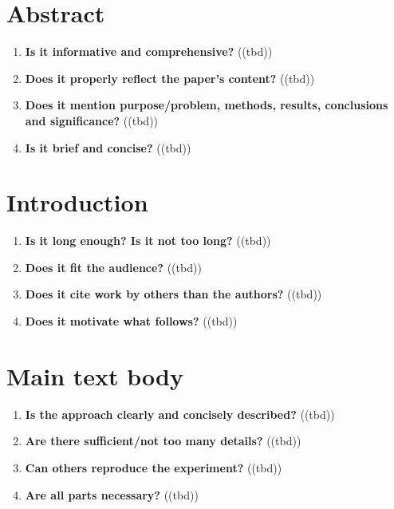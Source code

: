 \section{Abstract}\label{sec:abstract}
\begin{enumerate}[resume]
    \item \textbf{Is it informative and comprehensive?} 	\textcolor{HighlightColor}{((tbd))}
    \item \textbf{Does it properly reflect the paper’s content?} 	\textcolor{HighlightColor}{((tbd))}
    \item \textbf{Does it mention purpose/problem, methods, results, conclusions and significance?} 	\textcolor{HighlightColor}{((tbd))}
    \item \textbf{Is it brief and concise?} 	\textcolor{HighlightColor}{((tbd))}
\end{enumerate}

\section{Introduction}\label{sec:introduction}
\begin{enumerate}[resume]
    \item \textbf{Is it long enough? Is it not too long?} 	\textcolor{HighlightColor}{((tbd))}
    \item \textbf{Does it fit the audience?} 	\textcolor{HighlightColor}{((tbd))}
    \item \textbf{Does it cite work by others than the authors?} 	\textcolor{HighlightColor}{((tbd))}
    \item \textbf{Does it motivate what follows?} 	\textcolor{HighlightColor}{((tbd))}
\end{enumerate}

\section{Main text body}\label{sec:main}
\begin{enumerate}[resume]
    \item \textbf{Is the approach clearly and concisely described?} 	\textcolor{HighlightColor}{((tbd))}
    \item \textbf{Are there sufficient/not too many details?} 	\textcolor{HighlightColor}{((tbd))}
    \item \textbf{Can others reproduce the experiment?} 	\textcolor{HighlightColor}{((tbd))}
    \item \textbf{Are all parts necessary?} 	\textcolor{HighlightColor}{((tbd))}
\end{enumerate}

